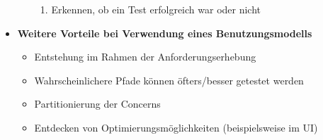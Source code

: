 \begin{itemize}
\begin{itemize}
\begin{enumerate}
			\item Erkennen, ob ein Test erfolgreich war oder nicht
		\end{enumerate}
	\end{itemize}
	\item \textbf{Weitere Vorteile bei Verwendung eines Benutzungsmodells}
	\begin{itemize}
		\item Entstehung im Rahmen der Anforderungserhebung
		\item Wahrscheinlichere Pfade können öfters/besser getestet werden
		\item Partitionierung der Concerns
		\item Entdecken von Optimierungsmöglichkeiten (beispielsweise im UI)
	\end{itemize}
\end{itemize}



